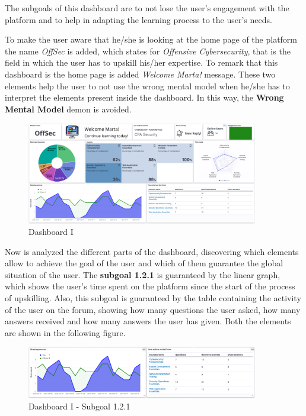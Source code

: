 The subgoals of this dashboard are to not lose the user's engagement with 
the platform and to help in adapting the learning process to the user's
needs. 

To make the user aware that he/she is looking
at the home page of the platform the name \textit{OffSec} is added,
which states for \textit{Offensive Cybersecurity}, that is the field
in which the user has to upskill his/her expertise. To remark that this
dashboard is the home page is added \textit{Welcome Marta!} message.
These two elements help the user to not use the wrong mental model
when he/she has to interpret the elements present inside the dashboard.
In this way, the \textbf{Wrong Mental Model} demon is avoided.

\begin{figure}[H]
    \centering
    \includegraphics[width=0.9\textwidth]{assets/dashboard_1.png}
    \caption{Dashboard I}
    \label{fig:dashboard_1}
\end{figure}

Now is analyzed the different parts of the dashboard, discovering which
elements allow to achieve the goal of the user and which of them guarantee the
global situation of the user. The \textbf{subgoal 1.2.1} is guaranteed by the linear graph,
which shows the user's time spent on the platform since the start of
the process of upskilling. Also, this subgoal is guaranteed by the table containing the activity of the
user on the forum, showing how many questions the user asked, how many
answers received and how many answers the user has given. 
Both the elements are shown in the following figure.

\begin{figure}[H]
    \centering
    \includegraphics[width=0.9\textwidth]{assets/dashboard_1_121.png}
    \caption{Dashboard I - Subgoal 1.2.1}
    \label{fig:dashboard_1_subgoal_121}
\end{figure}


